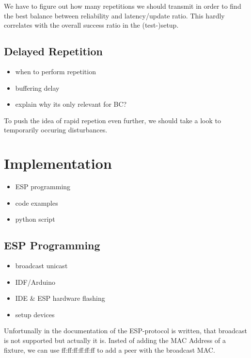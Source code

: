 \documentclass[]{ccs-thesis}
\begin{document}
We have to figure out how many repetitions we should transmit in order to find the best balance between reliability and latency/update ratio.
This hardly correlates with the overall success ratio in the (test-)setup. 

\subsection{Delayed Repetition}
\label{sub:DelayedRepetition}
\begin{itemize}
\item when to perform repetition
\item buffering delay
\item explain why its only relevant for BC?
\end{itemize}

To push the idea of rapid repetion even further, we should take a look to temporarily occuring disturbances.

\section{Implementation}
\begin{itemize}
\item ESP programming
\item code examples
\item python script
\end{itemize}

\subsection{ESP Programming}
\begin{itemize}
\item broadcast unicast
\item IDF/Arduino
\item IDE \& ESP hardware flashing
\item setup devices
\end{itemize}
Unfortunally in the documentation of the ESP-protocol is written, that broadcast is not supported 
but actually it is. Insted of adding the \ac{MAC} Address of a fixture, we can use 
 ff:ff:ff:ff:ff:ff 
to add a peer with the broadcast \ac{MAC}.
\end{document}
